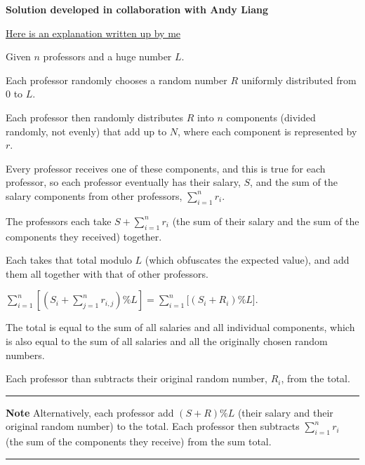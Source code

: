 \documentclass{article}
\begin{document}
\textbf{Solution developed in collaboration with Andy Liang}

\underline{Here is an explanation written up by me}\newline

Given $n$ professors and a huge number $L$.\newline

Each professor randomly chooses a random number $R$ uniformly distributed from 0 to $L$.\newline

Each professor then randomly distributes $R$ into $n$ components (divided randomly, not evenly) that add up to $N$, where each component is represented by $r$.\newline

Every professor receives one of these components, and this is true for each professor, so each professor eventually has their salary, $S$, and the sum of the salary components from other professors, $\sum_{i=1}^{n} r_i$.\newline

The professors each take $S+\sum_{i=1}^{n} r_i$ (the sum of their salary and the sum of the components they received) together. \newline

Each takes that total modulo $L$ (which obfuscates the expected value), and add them all together with that of other professors.\newline

$\sum_{i=1}^{n} [(S_i + \sum_{j=1}^{n} r_{i,j})\%L] = \sum_{i=1}^{n} [(S_i + R_i)\%L$].\newline

The total is equal to the sum of all salaries and all individual components, which is also equal to the sum of all salaries and all the originally chosen random numbers.\newline

Each professor than subtracts their original random number, $R_i$, from the total.\newline

\noindent\rule{10cm}{0.4pt}\newline

\textbf{Note} Alternatively, each professor add $(S + R)\%L$ (their salary and their original random number) to the total. Each professor then subtracts $\sum_{i=1}^{n} r_i$ (the sum of the components they receive) from the sum total.\newline

\noindent\rule{10cm}{0.4pt}\newline
\end{document}
